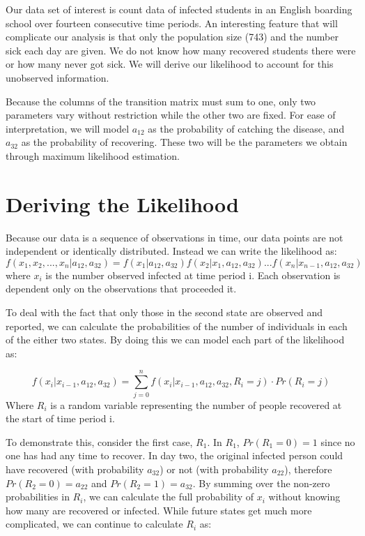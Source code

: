 \documentclass{svproc}
\begin{document}
Our data set of interest is count data of infected students in an English boarding school over fourteen consecutive time periods. An interesting feature that will complicate our analysis is that only the population size (743) and the number sick each day are given. We do not know how many recovered students there were or how many never got sick. We will derive our likelihood to account for this unobserved information. 

Because the columns of the transition matrix must sum to one, only two parameters vary without restriction while the other two are fixed. For ease of interpretation, we will model $a_{12}$ as the probability of catching the disease, and $a_{32}$ as the probability of recovering. These two will be the parameters we obtain through maximum likelihood estimation. 

\section{Deriving the Likelihood}
Because our data is a sequence of observations in time, our data points are not independent or identically distributed. Instead we can write the likelihood as:
\begin{equation}
f(x_1, x_2,...,x_n| a_{12}, a_{32}) = f(x_1| a_{12}, a_{32}) f(x_2|x_1, a_{12}, a_{32}) ... f(x_n|x_{n-1}, a_{12}, a_{32})
\end{equation}
where $x_i$ is the number observed infected at time period i. Each observation is dependent only on the observations that proceeded it.

To deal with the fact that only those in the second state are observed and reported, we can calculate the probabilities of the number of individuals in each of the either two states. By doing this we can model each part of the likelihood as:

\begin{equation}
f(x_i | x_{i-1}, a_{12}, a_{32}) =\sum_{j=0}^n f(x_i | x_{i-1}, a_{12}, a_{32}, R_i=j)\cdot Pr(R_i=j) 
\label{sum}
\end{equation}
Where $R_i$ is a random variable representing the number of people recovered at the start of time period i.

To demonstrate this, consider the first case, $R_1$. In $R_1$, $Pr(R_1=0)=1$ since no one has had any time to recover. In day two, the original infected person could have recovered (with probability $a_{32}$) or not (with probability $a_{22}$), therefore $Pr(R_2=0) = a_{22}$ and $Pr(R_2=1)=a_{32}$. By summing over the non-zero probabilities in $R_i$, we can calculate the full probability of $x_i$ without knowing how many are recovered or infected. While future states get much more complicated, we can continue to calculate $R_i$ as:
\end{document}
